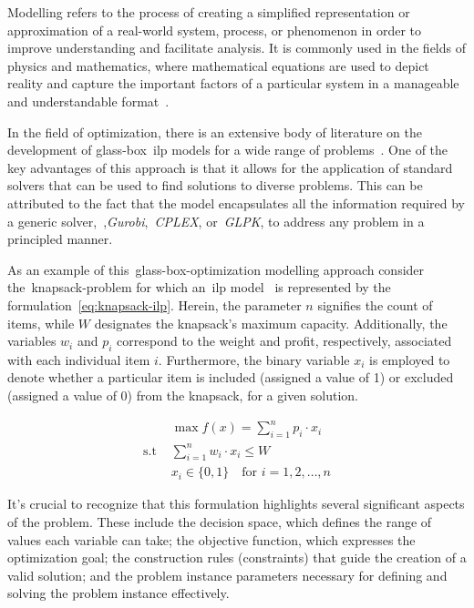 Modelling refers to the process of creating a simplified representation or
approximation of a real-world system, process, or phenomenon in order to improve
understanding and facilitate analysis. It is commonly used in the fields of
physics and mathematics, where mathematical equations are used to depict reality
and capture the important factors of a particular system in a manageable and
understandable format~\cite{witelski2015methods}.

In the field of optimization, there is an extensive body of literature on the
development of glass-box~\acrshort{ilp} models for a wide range of
problems~\cite{papadimitriou1998combinatorial,nocedal2006numerical,williamson2011design}.
One of the key advantages of this approach is that it allows for the application
of standard solvers that can be used to find solutions to diverse problems. This
can be attributed to the fact that the model encapsulates all the information
required by a generic solver,~\eg{},\textit{Gurobi},~\textit{CPLEX},
or~\textit{GLPK}, to address any problem in a principled manner.

As an example of this~\acrshort{glass-box-optimization} modelling approach
consider the~\acrshort{knapsack-problem} for which an~\acrshort{ilp}
model~\cite{yu2010combinatorial} is represented by the
formulation~\ref{eq:knapsack-ilp}.  Herein, the parameter $n$ signifies the
count of items, while $W$ designates the knapsack's maximum capacity.
Additionally, the variables $w_{i}$ and $p_{i}$ correspond to the weight and
profit, respectively, associated with each individual item $i$. Furthermore, the
binary variable $x_{i}$ is employed to denote whether a particular item is
included (assigned a value of 1) or excluded (assigned a value of 0) from the
knapsack, for a given solution.

\begin{equation}
      \label{eq:knapsack-ilp}
      \begin{aligned}
                        & \max f(x) = \sum_{i=1}^{n} p_i \cdot x_i               \\
            \text{s.t } & \sum_{i=1}^{n} w_i \cdot x_i \leq W                    \\
                        & x_i \in \{0, 1\} \quad \text{for } i = 1, 2, \ldots, n
      \end{aligned}
\end{equation}

It's crucial to recognize that this formulation highlights several significant
aspects of the problem. These include the decision space, which defines the
range of values each variable can take; the objective function, which expresses
the optimization goal; the construction rules (constraints) that guide the
creation of a valid solution; and the problem instance parameters necessary for
defining and solving the problem instance effectively.

